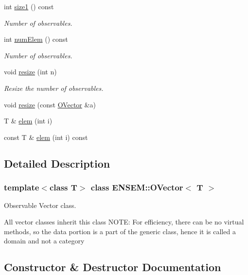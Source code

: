 \begin{DoxyCompactItemize}
int \mbox{\hyperlink{classENSEM_1_1OVector_af2035852c6cefe80834b8e2a17648113}{size1}} () const
\begin{DoxyCompactList}\small\item\em Number of observables. \end{DoxyCompactList}\item 
int \mbox{\hyperlink{classENSEM_1_1OVector_a77771968912766dab2f1bd6ed7ccc876}{num\+Elem}} () const
\begin{DoxyCompactList}\small\item\em Number of observables. \end{DoxyCompactList}\item 
void \mbox{\hyperlink{classENSEM_1_1OVector_a2758b982bf7fa25b69d31fe8d7f72762}{resize}} (int n)
\begin{DoxyCompactList}\small\item\em Resize the number of observables. \end{DoxyCompactList}\item 
void \mbox{\hyperlink{classENSEM_1_1OVector_a64fa4ad4d58dd32268c2bea8be1de212}{resize}} (const \mbox{\hyperlink{classENSEM_1_1OVector}{O\+Vector}} \&a)
\item 
T \& \mbox{\hyperlink{classENSEM_1_1OVector_a8d84b5c1145d0647107413d254450417}{elem}} (int i)
\item 
const T \& \mbox{\hyperlink{classENSEM_1_1OVector_afddf0b325b50484d1c8f0ab8f0abd3c8}{elem}} (int i) const
\end{DoxyCompactItemize}


\subsection{Detailed Description}
\subsubsection*{template$<$class T$>$\newline
class E\+N\+S\+E\+M\+::\+O\+Vector$<$ T $>$}

Observable Vector class. 

All vector classes inherit this class N\+O\+TE\+: For efficiency, there can be no virtual methods, so the data portion is a part of the generic class, hence it is called a domain and not a category 

\subsection{Constructor \& Destructor Documentation}
\mbox{\label{classENSEM_1_1OVector_a49c6719652aea7b411f9ce1e5aa38b18}} 
